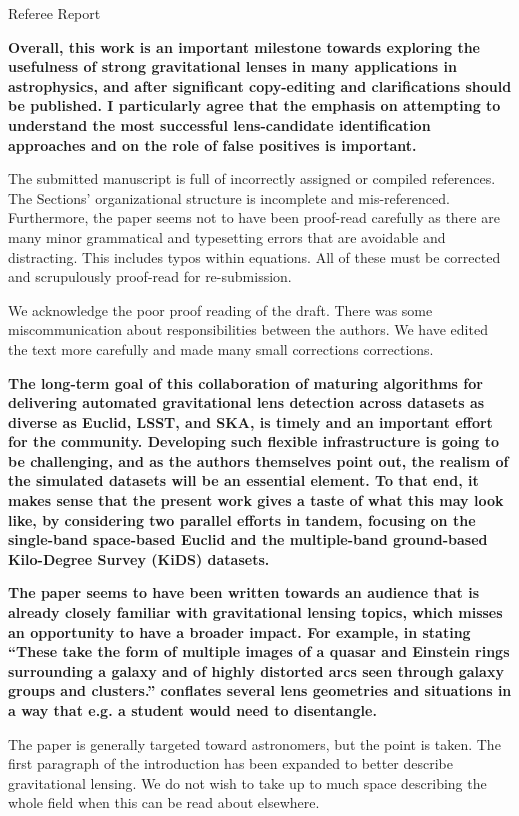 \documentclass[11pt,a4paper]{article}
\author{R.B. Metcalf}
\begin{document}
Referee Report

{\bf 
Overall, this work is an important milestone towards exploring the usefulness of strong gravitational lenses in many applications in astrophysics, and after significant copy-editing and clarifications should be published.  I particularly agree that the emphasis on attempting to understand the most successful lens-candidate identification approaches and on the role of false positives is important. 

The submitted manuscript is full of incorrectly assigned or compiled references.  The Sections’ organizational structure is incomplete and mis-referenced. Furthermore, the paper seems not to have been proof-read carefully as there are many minor grammatical and typesetting errors that are avoidable and distracting.  This includes typos within equations.  All of these must be corrected and scrupulously proof-read for re-submission.  }

We acknowledge the poor proof reading of the draft.  There was some miscommunication about responsibilities between the authors.  We have edited the text more carefully and made many small corrections corrections. 

{\bf
The long-term goal of this collaboration of maturing algorithms for delivering automated gravitational lens detection across datasets as diverse as Euclid, LSST, and SKA, is timely and an important effort for the community.  Developing such flexible infrastructure is going to be challenging, and as the authors themselves point out, the realism of the simulated datasets will be an essential element. To that end, it makes sense that the present work gives a taste of what this may look like, by considering two parallel efforts in tandem, focusing on the single-band space-based Euclid and the multiple-band ground-based Kilo-Degree Survey (KiDS) datasets. 
}

{\bf
The paper seems to have been written towards an audience that is already closely familiar with gravitational lensing topics, which misses an opportunity to have a broader impact. For example, in stating “These take the form of multiple images of a quasar and Einstein rings surrounding a galaxy and of highly distorted arcs seen through galaxy groups and clusters.” conflates several lens geometries and situations in a way that e.g. a student would need to disentangle. 
}

The paper is generally targeted toward astronomers, but the point is taken.  The first paragraph of the introduction has been expanded to better describe gravitational lensing.  We do not wish to take up to much space describing the whole field when this can be read about elsewhere.
\end{document}
